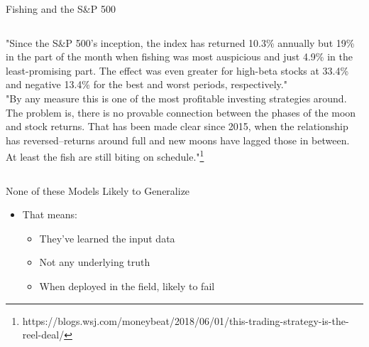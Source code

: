 \documentclass[aspectratio=169]{beamer}
\begin{document}
\begin{frame}{Fishing and the S\&P 500}
\begin{columns}[T]
\begin{column}{0.7\textwidth}
{\tiny

"Since the S\&P 500's inception, the index has returned 10.3\% annually but 19\% in the part of the month when fishing was most auspicious and just 4.9\% in the least-promising part. The effect was even greater for high-beta stocks at 33.4\% and negative 13.4\% for the best and worst periods, respectively."\\

"By any measure this is one of the most profitable investing strategies around. The problem is, there is no provable connection between the phases of the moon and stock returns. That has been made clear since 2015, when the relationship has reversed--returns around full and new moons have lagged those in between. At least the fish are still biting on schedule."\footnote{https://blogs.wsj.com/moneybeat/2018/06/01/this-trading-strategy-is-the-reel-deal/}}


\end{column}
\end{columns}

\end{frame}


\begin{frame}{None of these Models Likely to Generalize}

\begin{itemize}
\item That means:
	\begin{itemize}
	\item They've learned the input data
	\item Not any underlying truth
	\item When deployed in the field, likely to fail
	\end{itemize}
\end{itemize}
\end{frame}

\end{document}
